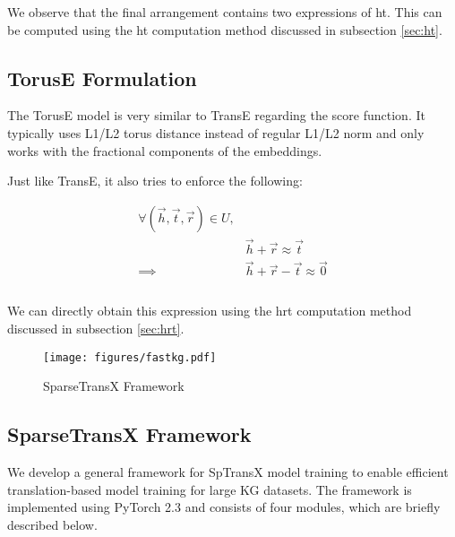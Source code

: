 We observe that the final arrangement contains two expressions of ht. This can be computed using the ht computation method discussed in subsection \ref{sec:ht}.

\subsection{TorusE Formulation}
\label{toruse_formulation}
The TorusE model is very similar to TransE regarding the score function. It typically uses L1/L2 torus distance instead of regular L1/L2 norm and only works with the fractional components of the embeddings.

Just like TransE, it also tries to enforce the following:
\begin{spacing}{0.5}
\begin{equation} \label{eq4}
\begin{split}
    \forall ( \Vec{h}, \Vec{t}, \Vec{r}) \in U, & \\
     & \Vec{h} + \Vec{r} \approx \Vec{t} \\
     \implies & \Vec{h} + \Vec{r} - \Vec{t}\approx \Vec{0} \\ \\
    \end{split}
\end{equation}
\end{spacing}

We can directly obtain this expression using the hrt computation method discussed in subsection \ref{sec:hrt}.



\begin{figure}[h]
    \centering
    \texttt{[image: figures/fastkg.pdf]}
    \caption{SparseTransX Framework}
    \label{fig:fastkg}
    \end{figure}
    
\subsection{SparseTransX Framework}
We develop a general framework for SpTransX model training to enable efficient translation-based model training for large KG datasets. The framework is implemented using PyTorch 2.3 and consists of four modules, which are briefly described below.

